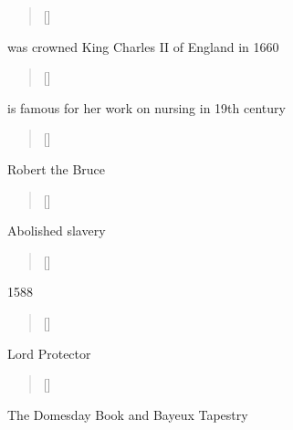 \documentclass[grid,avery5371]{flashcards}
\begin{document}
\begin{flashcard}[]{%
\begin{verse}[\versewidth]
\end{verse}}

was crowned King Charles II of England in 1660

\end{flashcard}

\begin{flashcard}[]{%
\begin{verse}[\versewidth]
\end{verse}}

is famous for her work on nursing in 19th century

\end{flashcard}


\begin{flashcard}[]{%
\begin{verse}[\versewidth]
\end{verse}}

Robert the Bruce

\end{flashcard}

\begin{flashcard}[]{%
\begin{verse}[\versewidth]
\end{verse}}

Abolished slavery 

\end{flashcard}


\begin{flashcard}[]{%
\begin{verse}[\versewidth]
\end{verse}}

1588

\end{flashcard}

\begin{flashcard}[]{%
\begin{verse}[\versewidth]
\end{verse}}

Lord Protector 

\end{flashcard}

\begin{flashcard}[]{%
\begin{verse}[\versewidth]
\end{verse}}

The Domesday Book and Bayeux Tapestry

\end{flashcard}
\end{document}
